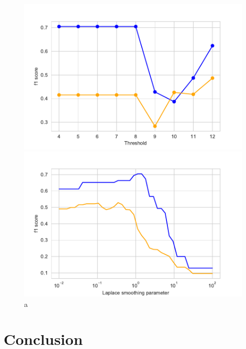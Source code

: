 \documentclass[11pt]{article}
\begin{document}
%
%
\begin{figure}[h]
\begin{minipage}[l]{0.5\textwidth}
\includegraphics[width=1\linewidth]{bridges/thresholds_nb.pdf}
\end{minipage}
\begin{minipage}[l]{0.5\textwidth}
\includegraphics[width=1\linewidth]{bridges/laplace_nb.pdf}
\end{minipage}
\caption{a}
\label{Fig:: NB_result_manual parameter_tuning}
\end{figure}

\newpage
\section{Conclusion}
\end{document}
